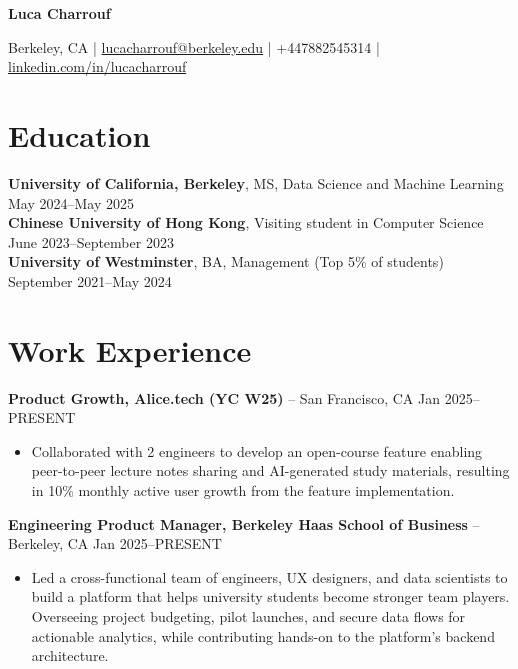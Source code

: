 \documentclass{article}
\begin{document}
\begin{center}
\textbf{\Large Luca Charrouf}

Berkeley, CA | \href{mailto:lucacharrouf@berkeley.edu}{lucacharrouf@berkeley.edu} | +447882545314 | \href{https://linkedin.com/in/lucacharrouf}{linkedin.com/in/lucacharrouf}
\end{center}

\section*{Education}
\textbf{University of California, Berkeley}, MS, Data Science and Machine Learning \hfill May 2024--May 2025\\
\textbf{Chinese University of Hong Kong}, Visiting student in Computer Science \hfill June 2023--September 2023\\
\textbf{University of Westminster}, BA, Management (Top 5\% of students) \hfill September 2021--May 2024

\section*{Work Experience}
\textbf{Product Growth, Alice.tech (YC W25)} -- San Francisco, CA \hfill Jan 2025--PRESENT
\begin{itemize}[leftmargin=*,noitemsep,topsep=0pt]
    \item Collaborated with 2 engineers to develop an open-course feature enabling peer-to-peer lecture notes sharing and AI-generated study materials, resulting in 10\% monthly active user growth from the feature implementation.
\end{itemize}

\textbf{Engineering Product Manager, Berkeley Haas School of Business} -- Berkeley, CA \hfill Jan 2025--PRESENT
\begin{itemize}[leftmargin=*,noitemsep,topsep=0pt]
    \item Led a cross-functional team of engineers, UX designers, and data scientists to build a platform that helps university students become stronger team players. Overseeing project budgeting, pilot launches, and secure data flows for actionable analytics, while contributing hands-on to the platform's backend architecture.
\end{itemize}
\end{document}

